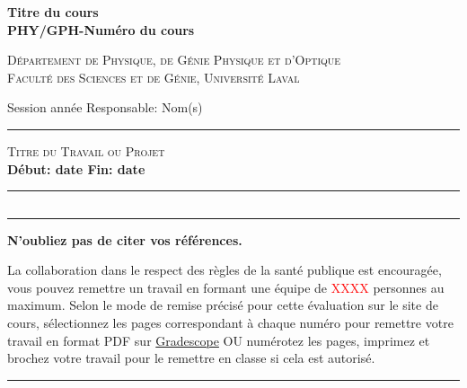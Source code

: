 \documentclass[english,french,12pt]{article}
\begin{document}
%
%
\begin{center}
    \textbf{\large{Titre du cours}}\\
    \vspace{0.2em}
    \textbf{PHY/GPH-Numéro du cours}\par
    \textsc{Département de Physique, de Génie Physique et d'Optique\\
    Faculté des Sciences et de Génie, Université Laval}
\end{center}

\vspace{-1em}
\noindent Session année \hfill Responsable: Nom(s)\par
\vspace{0.2em}
\hrule
\vspace{0.5em}
\centering 
    \textsc{Titre du Travail ou Projet}\\
\vspace{0.5em}
\textbf{Début: date \hfill Fin: date}\par
\vspace{0.4em}
\hrule
\justify
%
\vspace{-0.5em}
\subsection*{}


 
\vfill
\hrule
\vspace{0.3em}
\centering
\textbf{N'oubliez pas de citer vos références.}\par %
\vspace{-0.3em}
La collaboration dans le respect des règles de la santé publique est encouragée, vous pouvez remettre un travail en formant une équipe de \textcolor{red}{XXXX} personnes au maximum. Selon le mode de remise précisé pour cette évaluation sur le site de cours, sélectionnez les pages correspondant à chaque numéro pour remettre votre travail en format PDF sur \href{https://www.gradescope.com/}{Gradescope} OU numérotez les pages, imprimez et brochez votre travail pour le remettre en classe si cela est autorisé.\par
\vspace{1em}
\hrule
\end{document}
